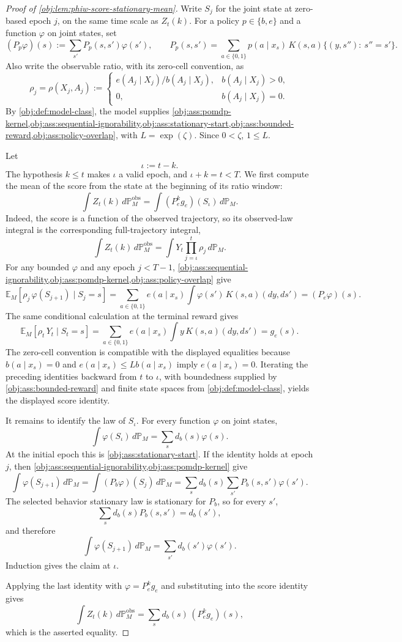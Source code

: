 \begin{proof}[Proof of \cref{obj:lem:phiw-score-stationary-mean}]
Write \(S_j\) for the joint state at zero-based epoch \(j\), on the same time scale as \(Z_t(k)\). For a policy \(p\in\{b,e\}\) and a function \(\varphi\) on joint states, set
\[
(P_p\varphi)(s)
:=
\sum_{s'} P_p(s,s')\varphi(s'),
\qquad
P_p(s,s')
=
\sum_{a\in\{0,1\}}p(a\mid x_s)\,
K(s,a)\{(y,s''):\ s''=s'\}.
\]
Also write the observable ratio, with its zero-cell convention, as
\[
\rho_j
=
\rho(X_j,A_j)
:=
\begin{cases}
e(A_j\mid X_j)/b(A_j\mid X_j),& b(A_j\mid X_j)>0,\\
0,& b(A_j\mid X_j)=0.
\end{cases}
\]
By \cref{obj:def:model-class}, the model supplies \cref{obj:ass:pomdp-kernel,obj:ass:sequential-ignorability,obj:ass:stationary-start,obj:ass:bounded-reward,obj:ass:policy-overlap}, with \(L=\exp(\zeta)\). Since \(0<\zeta\), \(1\le L\).

Let
\[
\iota:=t-k .
\]
The hypothesis \(k\le t\) makes \(\iota\) a valid epoch, and \(\iota+k=t<T\). We first compute the mean of the score from the state at the beginning of its ratio window:
\[
\int Z_t(k)\,d\mathbb P_M^{\mathrm{obs}}
=
\int (P_e^k g_e)(S_\iota)\,d\mathbb P_M .
\]
Indeed, the score is a function of the observed trajectory, so its observed-law integral is the corresponding full-trajectory integral,
\[
\int Z_t(k)\,d\mathbb P_M^{\mathrm{obs}}
=
\int
Y_t\prod_{j=\iota}^{t}\rho_j
\,d\mathbb P_M .
\]
For any bounded \(\varphi\) and any epoch \(j<T-1\), \cref{obj:ass:sequential-ignorability,obj:ass:pomdp-kernel,obj:ass:policy-overlap} give
\[
\mathbb E_M\!\left[\rho_j\,\varphi(S_{j+1})\mid S_j=s\right]
=
\sum_{a\in\{0,1\}} e(a\mid x_s)
\int \varphi(s')\,K(s,a)(dy,ds')
=
(P_e\varphi)(s).
\]
The same conditional calculation at the terminal reward gives
\[
\mathbb E_M\!\left[\rho_t\,Y_t\mid S_t=s\right]
=
\sum_{a\in\{0,1\}} e(a\mid x_s)
\int y\,K(s,a)(dy,ds')
=
g_e(s).
\]
The zero-cell convention is compatible with the displayed equalities because \(b(a\mid x_s)=0\) and \(e(a\mid x_s)\le Lb(a\mid x_s)\) imply \(e(a\mid x_s)=0\). Iterating the preceding identities backward from \(t\) to \(\iota\), with boundedness supplied by \cref{obj:ass:bounded-reward} and finite state spaces from \cref{obj:def:model-class}, yields the displayed score identity.

It remains to identify the law of \(S_\iota\). For every function \(\varphi\) on joint states,
\[
\int \varphi(S_\iota)\,d\mathbb P_M
=
\sum_s d_b(s)\varphi(s).
\]
At the initial epoch this is \cref{obj:ass:stationary-start}. If the identity holds at epoch \(j\), then \cref{obj:ass:sequential-ignorability,obj:ass:pomdp-kernel} give
\[
\int \varphi(S_{j+1})\,d\mathbb P_M
=
\int (P_b\varphi)(S_j)\,d\mathbb P_M
=
\sum_s d_b(s)\sum_{s'}P_b(s,s')\varphi(s').
\]
The selected behavior stationary law is stationary for \(P_b\), so for every \(s'\),
\[
\sum_s d_b(s)P_b(s,s')=d_b(s'),
\]
and therefore
\[
\int \varphi(S_{j+1})\,d\mathbb P_M
=
\sum_{s'}d_b(s')\varphi(s').
\]
Induction gives the claim at \(\iota\).

Applying the last identity with \(\varphi=P_e^k g_e\) and substituting into the score identity gives
\[
\int Z_t(k)\,d\mathbb P_M^{\mathrm{obs}}
=
\sum_s d_b(s)\,(P_e^k g_e)(s),
\]
which is the asserted equality.
\end{proof}
